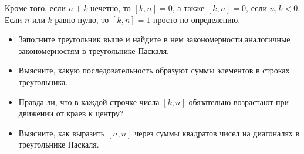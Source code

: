 Кроме того, если $n+k$ нечетно, то $[k,n] = 0$, а также $[k,n] = 0$, если $n,k < 0$. Если $n$ или $k$ равно нулю, то $[k,n] = 1$ просто по определению.
\begin{itemize}
\item Заполните треугольник выше и найдите в нем закономерности,\linebreak аналогичные закономерностям в треугольнике Паскаля.
\item Выясните, какую последовательность образуют суммы элементов в строках треугольника.
\item Правда ли, что в каждой строчке числа $[k,n]$ обязательно возрастают при движении от краев к центру?
\item Выясните, как выразить $[n,n]$ через суммы квадратов чисел на диагоналях в треугольнике Паскаля.
\end{itemize}